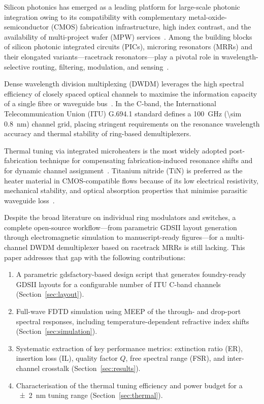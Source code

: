Silicon photonics has emerged as a leading platform for large-scale
photonic integration owing to its compatibility with complementary
metal-oxide-semiconductor (CMOS) fabrication infrastructure, high
index contrast, and the availability of multi-project wafer (MPW)
services~\cite{reed2010silicon, bogaerts2012silicon}.  Among the
building blocks of silicon photonic integrated circuits (PICs), microring
resonators (MRRs) and their elongated variants---racetrack
resonators---play a pivotal role in wavelength-selective routing,
filtering, modulation, and sensing~\cite{little1997microring,
yariv2000critical}.

Dense wavelength division multiplexing (DWDM) leverages the high
spectral efficiency of closely spaced optical channels to maximise
the information capacity of a single fibre or waveguide
bus~\cite{winzer2012optical}. In the C-band,
the International Telecommunication Union (ITU) G.694.1 standard
defines a \SI{100}{\giga\hertz} (\SI{\sim 0.8}{\nano\meter}) channel
grid, placing stringent requirements on the resonance wavelength
accuracy and thermal stability of ring-based demultiplexers.

Thermal tuning via integrated microheaters is the most widely adopted
post-fabrication technique for compensating fabrication-induced
resonance shifts and for dynamic channel
assignment~\cite{dong2010thermally, watts2013adiabatic}. Titanium
nitride (TiN) is preferred as the heater material in CMOS-compatible
flows because of its low electrical resistivity, mechanical stability,
and optical absorption properties that minimise parasitic waveguide
loss~\cite{sacher2014wide}.

Despite the broad literature on individual ring modulators and switches,
a complete open-source workflow---from parametric GDSII layout generation
through electromagnetic simulation to manuscript-ready figures---for a
multi-channel DWDM demultiplexer based on racetrack MRRs is still
lacking.  This paper addresses that gap with the following contributions:

\begin{enumerate}
  \item A parametric gdsfactory-based design script that generates
        foundry-ready GDSII layouts for a configurable number of ITU
        C-band channels (Section~\ref{sec:layout}).
  \item Full-wave FDTD simulation using MEEP of the through- and
        drop-port spectral responses, including temperature-dependent
        refractive index shifts (Section~\ref{sec:simulation}).
  \item Systematic extraction of key performance metrics: extinction
        ratio (ER), insertion loss (IL), quality factor $Q$, free
        spectral range (FSR), and inter-channel crosstalk
        (Section~\ref{sec:results}).
  \item Characterisation of the thermal tuning efficiency and power
        budget for a \SI{\pm 2}{\nano\meter} tuning range
        (Section~\ref{sec:thermal}).
\end{enumerate}

